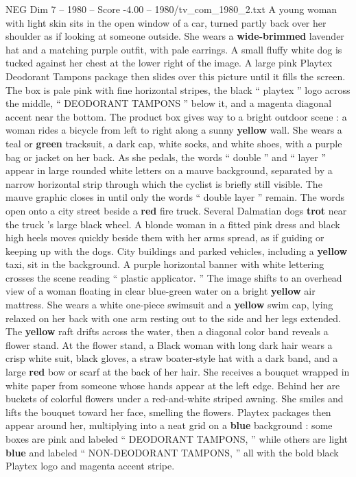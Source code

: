 \begin{textsample}{NEG Dim 7 – 1980 – Score -4.00 – 1980/tv\_com\_1980\_2.txt}  \label{ex:f7_neg_058}
A young woman with light skin sits in the open window of a car, turned partly back over her shoulder as if looking at someone outside.
She wears a \textbf{wide-brimmed} lavender hat and a matching purple outfit, with pale earrings.
A small fluffy white dog is tucked against her chest at the lower right of the image.
A large pink Playtex Deodorant Tampons package then slides over this picture until it fills the screen.
The box is pale pink with fine horizontal stripes, the black “ playtex ” logo across the middle, “ DEODORANT TAMPONS ” below it, and a magenta diagonal accent near the bottom.
The product box gives way to a bright outdoor scene : a woman rides a bicycle from left to right along a sunny \textbf{yellow} wall.
She wears a teal or \textbf{green} tracksuit, a dark cap, white socks, and white shoes, with a purple bag or jacket on her back.
As she pedals, the words “ double ” and “ layer ” appear in large rounded white letters on a mauve background, separated by a narrow horizontal strip through which the cyclist is briefly still visible.
The mauve graphic closes in until only the words “ double layer ” remain.
The words open onto a city street beside a \textbf{red} fire truck.
Several Dalmatian dogs \textbf{trot} near the truck ’s large black wheel.
A blonde woman in a fitted pink dress and black high heels moves quickly beside them with her arms spread, as if guiding or keeping up with the dogs.
City buildings and parked vehicles, including a \textbf{yellow} taxi, sit in the background.
A purple horizontal banner with white lettering crosses the scene reading “ plastic applicator. ” The image shifts to an overhead view of a woman floating in clear blue-green water on a bright \textbf{yellow} air mattress.
She wears a white one-piece swimsuit and a \textbf{yellow} swim cap, lying relaxed on her back with one arm resting out to the side and her legs extended.
The \textbf{yellow} raft drifts across the water, then a diagonal color band reveals a flower stand.
At the flower stand, a Black woman with long dark hair wears a crisp white suit, black gloves, a straw boater-style hat with a dark band, and a large \textbf{red} bow or scarf at the back of her hair.
She receives a bouquet wrapped in white paper from someone whose hands appear at the left edge.
Behind her are buckets of colorful flowers under a red-and-white striped awning.
She smiles and lifts the bouquet toward her face, smelling the flowers.
Playtex packages then appear around her, multiplying into a neat grid on a \textbf{blue} background : some boxes are pink and labeled “ DEODORANT TAMPONS, ” while others are light \textbf{blue} and labeled “ NON-DEODORANT TAMPONS, ” all with the bold black Playtex logo and magenta accent stripe.

\end{textsample}
